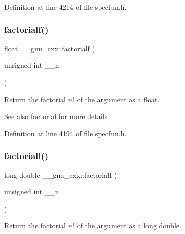 Definition at line 4214 of file specfun.\+h.

\mbox{\label{group__mathsf__gnu_ga5a288283a8ed63e1d2b0145f313a5378}} 
\subsubsection{\texorpdfstring{factorialf()}{factorialf()}}
{\footnotesize\ttfamily float \+\_\+\+\_\+gnu\+\_\+cxx\+::factorialf (\begin{DoxyParamCaption}\item[{unsigned int}]{\+\_\+\+\_\+n }\end{DoxyParamCaption})\hspace{0.3cm}{\ttfamily [inline]}}

Return the factorial $ n! $ of the argument as a {\ttfamily float}.

\begin{DoxySeeAlso}{See also}
\hyperlink{group__mathsf__gnu_ga963b1612f50b0964f5f42c9f289aab68}{factorial} for more details 
\end{DoxySeeAlso}


Definition at line 4194 of file specfun.\+h.

\mbox{\label{group__mathsf__gnu_ga0904e504fdc3c8b9b6f5c66a73531584}} 
\subsubsection{\texorpdfstring{factoriall()}{factoriall()}}
{\footnotesize\ttfamily long double \+\_\+\+\_\+gnu\+\_\+cxx\+::factoriall (\begin{DoxyParamCaption}\item[{unsigned int}]{\+\_\+\+\_\+n }\end{DoxyParamCaption})\hspace{0.3cm}{\ttfamily [inline]}}

Return the factorial $ n! $ of the argument as a {\ttfamily long double}.

